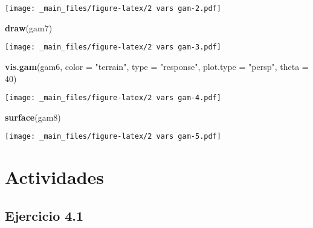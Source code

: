 \documentclass[
]{book}
\newenvironment{Shaded}{\begin{snugshade}}{\end{snugshade}}
\newcommand{\CommentTok}[1]{\textcolor[rgb]{0.56,0.35,0.01}{\textit{#1}}}
\newcommand{\DataTypeTok}[1]{\textcolor[rgb]{0.13,0.29,0.53}{#1}}
\newcommand{\DecValTok}[1]{\textcolor[rgb]{0.00,0.00,0.81}{#1}}
\newcommand{\KeywordTok}[1]{\textcolor[rgb]{0.13,0.29,0.53}{\textbf{#1}}}
\newcommand{\NormalTok}[1]{#1}
\newcommand{\OperatorTok}[1]{\textcolor[rgb]{0.81,0.36,0.00}{\textbf{#1}}}
\newcommand{\StringTok}[1]{\textcolor[rgb]{0.31,0.60,0.02}{#1}}
\begin{document}
\begin{Shaded}
\end{Shaded}

\texttt{[image: \_main\_files/figure-latex/2 vars gam-2.pdf]}

\begin{Shaded}
\begin{Highlighting}[]
\KeywordTok{draw}\NormalTok{(gam7)}
\end{Highlighting}
\end{Shaded}

\texttt{[image: \_main\_files/figure-latex/2 vars gam-3.pdf]}

\begin{Shaded}
\begin{Highlighting}[]
\KeywordTok{vis.gam}\NormalTok{(gam6, }\DataTypeTok{color =} \StringTok{"terrain"}\NormalTok{, }\DataTypeTok{type =} \StringTok{"response"}\NormalTok{, }\DataTypeTok{plot.type =} \StringTok{"persp"}\NormalTok{, }\DataTypeTok{theta =} \DecValTok{40}\NormalTok{)}
\end{Highlighting}
\end{Shaded}

\texttt{[image: \_main\_files/figure-latex/2 vars gam-4.pdf]}

\begin{Shaded}
\begin{Highlighting}[]
\KeywordTok{surface}\NormalTok{(gam8)}
\end{Highlighting}
\end{Shaded}

\texttt{[image: \_main\_files/figure-latex/2 vars gam-5.pdf]}

\hypertarget{actividades-3}{%
\section{Actividades}\label{actividades-3}}

\hypertarget{ejercicio-4.1}{%
\subsection{Ejercicio 4.1}\label{ejercicio-4.1}}
\end{document}

